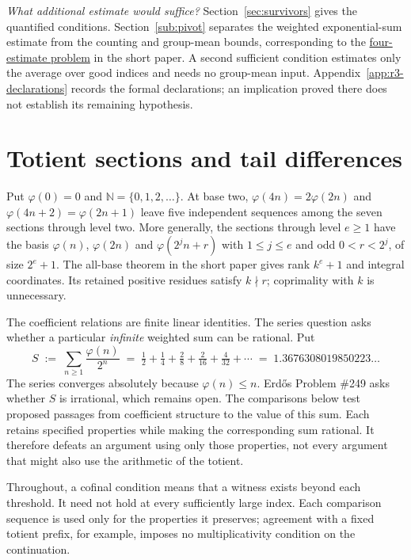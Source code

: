 \documentclass[11pt]{article}
\theoremstyle{plain}
\theoremstyle{definition}
\theoremstyle{remark}
\newcommand{\N}{\mathbb{N}}
\newcommand{\shortpaper}[2]{\href{erdos-249-binary-totient-series.pdf\##1}{#2}}
\begin{document}
\emph{What additional estimate would suffice?}
Section~\ref{sec:survivors} gives the quantified conditions.
Section~\ref{sub:pivot} separates the weighted exponential-sum estimate
from the counting and group-mean bounds, corresponding to the
\shortpaper{short249-first-harmonic}{four-estimate problem} in the
short paper. A second sufficient condition estimates only the average
over good indices and needs no group-mean input.
Appendix~\ref{app:r3-declarations} records the formal declarations;
an implication proved there does not establish its remaining hypothesis.

\setcounter{tocdepth}{1}
\clearpage
\tableofcontents
\clearpage
\section{Totient sections and tail differences}

Put $\varphi(0)=0$ and $\N=\{0,1,2,\ldots\}$. At base two,
$\varphi(4n)=2\varphi(2n)$ and $\varphi(4n+2)=\varphi(2n+1)$ leave five
independent sequences among the seven sections through level two.
More generally, the sections through level $e\ge1$ have the basis
$\varphi(n)$, $\varphi(2n)$ and $\varphi(2^jn+r)$ with
$1\le j\le e$ and odd $0<r<2^j$, of size $2^e+1$.
The all-base theorem in the short paper gives rank $k^e+1$ and integral
coordinates. Its retained positive residues satisfy $k\nmid r$;
coprimality with $k$ is unnecessary.

The coefficient relations are finite linear identities. The series
question asks whether a particular \emph{infinite} weighted sum can
be rational. Put
\[
  S \;:=\; \sum_{n \ge 1} \frac{\varphi(n)}{2^{n}}
  \;=\; \tfrac12 + \tfrac14 + \tfrac{2}{8} + \tfrac{2}{16} + \tfrac{4}{32} + \cdots
  \;=\; 1.3676308019850223\ldots
\]
The series converges absolutely because $\varphi(n) \le n$. Erd\H{o}s Problem
\#249 asks whether $S$ is irrational, which remains open. The comparisons below test proposed passages from coefficient structure
to the value of this sum. Each retains specified properties while making
the corresponding sum rational. It therefore defeats an argument using
only those properties, not every argument that might also use the
arithmetic of the totient.

Throughout, a cofinal condition means that a witness exists beyond each
threshold. It need not hold at every sufficiently large index. Each
comparison sequence is used only for the properties it preserves;
agreement with a fixed totient prefix, for example, imposes no
multiplicativity condition on the continuation.
\end{document}
